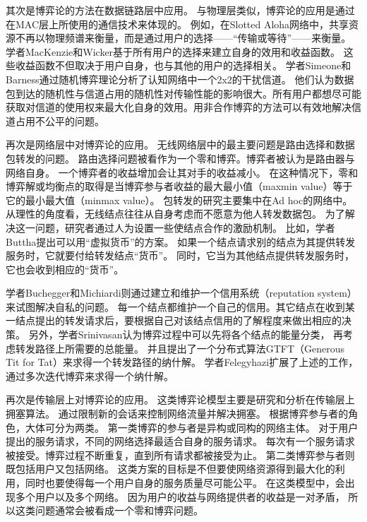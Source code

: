 其次是博弈论的方法在数据链路层中应用。
与物理层类似，博弈论的应用是通过在MAC层上所使用的通信技术来体现的。
例如，在Slotted Aloha网络中，共享资源不再以物理频谱来衡量，而是通过用户的选择——“传输或等待”——来衡量。
学者MacKenzie和Wicker基于所有用户的选择来建立自身的效用和收益函数\cite{MackenzieWiker:2001}。
这些收益函数不但取决于用户自身，也与其他的用户的选择相关。
学者Simeone和Barness通过随机博弈理论分析了认知网络中一个2x2的干扰信道。
他们认为数据包到达的随机性与信道占用的随机性对传输性能的影响很大。所有用户都想尽可能获取对信道的使用权来最大化自身的效用。用非合作博弈的方法可以有效地解决信道占用不公平的问题\cite{SimeoneBarNess:2007}。

再次是网络层中对博弈论的应用。
无线网络层中的最主要问题是路由选择和数据包转发的问题。
路由选择问题被看作为一个零和博弈。博弈者被认为是路由器与网络自身。
一个博弈者的收益增加会让其对手的收益减小。
在这种情况下，零和博弈解或均衡点的取得是当博弈参与者收益的最大最小值（maxmin value）等于它的最小最大值（minmax value）。
包转发的研究主要集中在Ad hoc的网络中。
从理性的角度看，无线结点往往从自身考虑而不愿意为他人转发数据包\cite{Pavlidou2008}。
为了解决这一问题，研究者通过人为设置一些使结点合作的激励机制。
比如，学者Buttha提出可以用“虚拟货币”的方案\cite{Butty_Hubaux_2003}。
如果一个结点请求别的结点为其提供转发服务时，它就要付给转发结点“货币”。
同时，它当为其他结点提供转发服务时，它也会收到相应的“货币”。

学者Buchegger和Michiardi则通过建立和维护一个信用系统（reputation system）来试图解决自私的问题\cite{Buchegger_Boudec_2002}\cite{Michiardi_Molva_2002}。
每一个结点都维护一个自己的信用。其它结点在收到某一结点提出的转发请求后，要根据自己对该结点信用的了解程度来做出相应的决策。
另外，学者Srinivasan认为博弈过程中可以先将各个结点的能量分类，
再考虑转发路径上所需要的总能量。
并且提出了一个分布式算法GTFT（Generous Tit for Tat）来求得一个转发路径的纳什解\cite{Srinivasan2003}。
学者Felegyhazi扩展了上述的工作，通过多次迭代博弈来求得一个纳什解\cite{FelegyhaziHubaux2006}。

再次是传输层上对博弈论的应用。
这类博弈论模型主要是研究和分析在传输层上拥塞算法。
通过限制新的会话来控制网络流量并解决拥塞。
根据博弈参与者的角色，大体可分为两类。
第一类博弈的参与者是异构或同构的网络主体。
对于用户提出的服务请求，不同的网络选择最适合自身的服务请求\cite{Charilas2009}。
每次有一个服务请求被接受。博弈过程不断重复，直到所有请求都被接受为止。
第二类博弈参与者则既包括用户又包括网络。
这类方案的目标是不但要使网络资源得到最大化的利用，同时也要使得每一个用户自身的服务质量尽可能公平。
在这类模型中，会出现多个用户以及多个网络。
因为用户的收益与网络提供者的收益是一对矛盾，
所以这类问题通常会被看成一个零和博弈问题\cite{LinChatterjee2005}\cite{VlacheasCharilas2008}。

